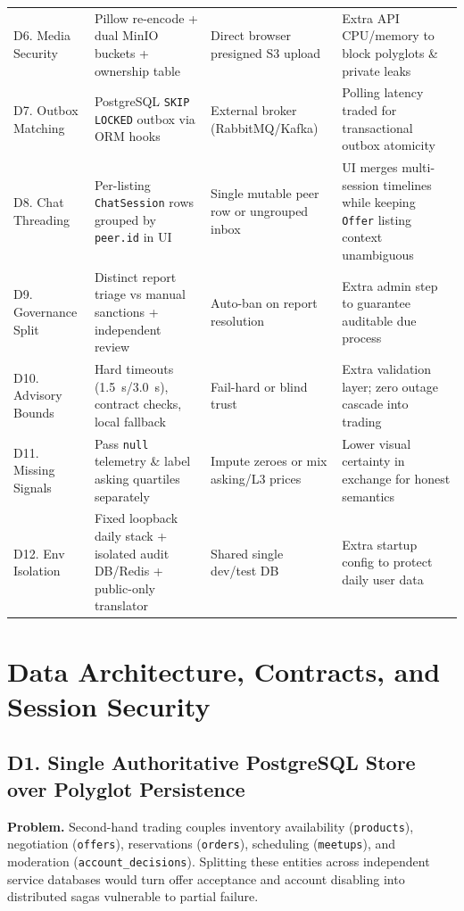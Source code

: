 \begin{table}[htbp]
\begin{tabularx}{\linewidth}{@{}>{\raggedright\arraybackslash}p{2.9cm}>{\raggedright\arraybackslash}X>{\raggedright\arraybackslash}p{3.4cm}>{\raggedright\arraybackslash}X@{}}
    D6. Media Security & Pillow re-encode + dual MinIO buckets + ownership table & Direct browser presigned S3 upload & Extra API CPU/memory to block polyglots \& private leaks \\
    D7. Outbox Matching & PostgreSQL \texttt{SKIP LOCKED} outbox via ORM hooks & External broker (RabbitMQ/Kafka) & Polling latency traded for transactional outbox atomicity \\
    D8. Chat Threading & Per-listing \texttt{ChatSession} rows grouped by \texttt{peer.id} in UI & Single mutable peer row or ungrouped inbox & UI merges multi-session timelines while keeping \texttt{Offer} listing context unambiguous \\
    D9. Governance Split & Distinct report triage vs manual sanctions + independent review & Auto-ban on report resolution & Extra admin step to guarantee auditable due process \\
    D10. Advisory Bounds & Hard timeouts (1.5~s/3.0~s), contract checks, local fallback & Fail-hard or blind trust & Extra validation layer; zero outage cascade into trading \\
    D11. Missing Signals & Pass \texttt{null} telemetry \& label asking quartiles separately & Impute zeroes or mix asking/L3 prices & Lower visual certainty in exchange for honest semantics \\
    D12. Env Isolation & Fixed loopback daily stack + isolated audit DB/Redis + public-only translator & Shared single dev/test DB & Extra startup config to protect daily user data \\
    \bottomrule
  \end{tabularx}
\end{table}

\section{Data Architecture, Contracts, and Session Security}
\label{sec:dec-core}

\subsection{D1. Single Authoritative PostgreSQL Store over Polyglot Persistence}

\textbf{Problem.} Second-hand trading couples inventory availability (\texttt{products}), negotiation (\texttt{offers}), reservations (\texttt{orders}), scheduling (\texttt{meetups}), and moderation (\texttt{account\_\allowbreak decisions}). Splitting these entities across independent service databases would turn offer acceptance and account disabling into distributed sagas vulnerable to partial failure.

